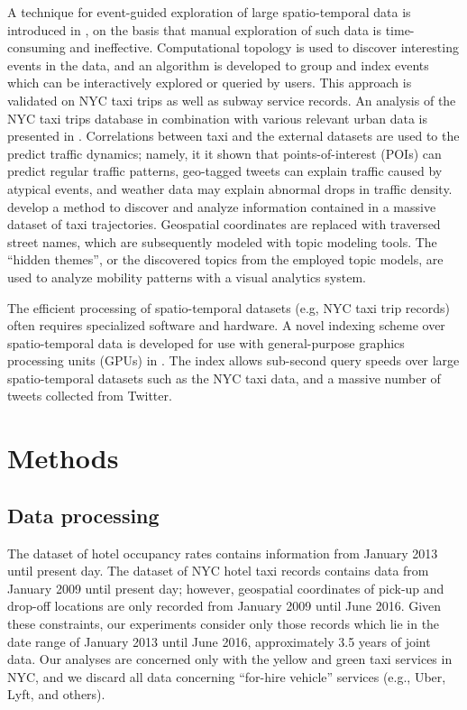\documentclass[useAMS, usenatbib]{biom}
\begin{document}
A technique for event-guided exploration of large spatio-temporal data is introduced in \citet{Doraiswamy2014UsingTA}, on the basis that manual exploration of such data is time-consuming and ineffective. Computational topology is used to discover interesting events in the data, and an algorithm is developed to group and index events which can be interactively explored or queried by users. This approach is validated on NYC taxi trips as well as subway service records. An analysis of the NYC taxi trips database in combination with various relevant urban data is presented in \citet{Wu2016InterpretingTD}. Correlations between taxi and the external datasets are used to the predict traffic dynamics; namely, it it shown that points-of-interest (POIs) can predict regular traffic patterns, geo-tagged tweets can explain traffic caused by atypical events, and weather data may explain abnormal drops in traffic density. \citet{Chu2014VisualizingHT} develop a method to discover and analyze information contained in a massive dataset of taxi trajectories. Geospatial coordinates are replaced with traversed street names, which are subsequently modeled with topic modeling tools. The ``hidden themes'', or the discovered topics from the employed topic models, are used to analyze mobility patterns with a visual analytics system. 

The efficient processing of spatio-temporal datasets (e.g, NYC taxi trip records) often requires specialized software and hardware. A novel indexing scheme over spatio-temporal data is developed for use with general-purpose graphics processing units (GPUs) in \citet{Doraiswamy2016AGI}. The index allows sub-second query speeds over large spatio-temporal datasets such as the NYC taxi data, and a massive number of tweets collected from Twitter.

\section{Methods}
\label{s:methods}

\subsection{Data processing}

The dataset of hotel occupancy rates contains information from January 2013 until present day. The dataset of NYC hotel taxi records contains data from January 2009 until present day; however, geospatial coordinates of pick-up and drop-off locations are only recorded from January 2009 until June 2016. Given these constraints, our experiments consider only those records which lie in the date range of January 2013 until June 2016, approximately 3.5 years of joint data. Our analyses are concerned only with the yellow and green taxi services in NYC, and we discard all data concerning ``for-hire vehicle'' services (e.g., Uber, Lyft, and others).
\end{document}
